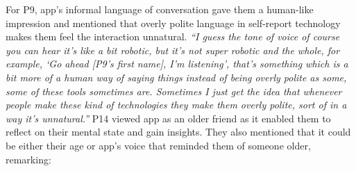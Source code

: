             For P9, \acl{app}'s informal language of conversation gave them a human-like impression and mentioned that overly polite language in self-report technology makes them feel the interaction unnatural.
                \textit{
                ``I guess the tone of voice of course you can hear it's like a bit robotic, but it's not super robotic and the whole, for example, `Go ahead [P9's first name], I'm listening', that's something which is a bit more of a human way of saying things instead of being overly polite as some, some of these tools sometimes are.
                Sometimes I just get the idea that whenever people make these kind of technologies they make them overly polite, sort of in a way it's unnatural.''
                }
            P14 viewed \acl{app} as an older friend as it enabled them to reflect on their mental state and gain insights. They also mentioned that it could be either their age or \acl{app}'s voice that reminded them of someone older, remarking:
